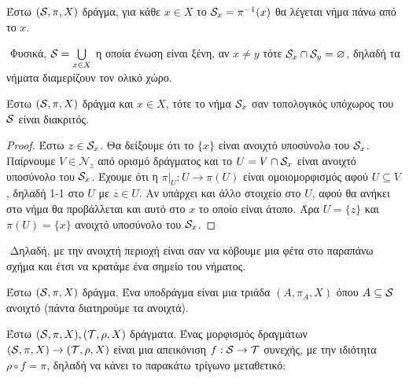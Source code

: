 \begin{defn} Έστω $(\mathcal{S}, \pi, X)$ δράγμα, για κάθε $x \in X$ το $\mathcal{S}_x = \pi^{-1}(x)$ θα λέγεται νήμα πάνω από το $x$.
\end{defn}

$ $\newline
Φυσικά, $\mathcal{S} = \bigcup\limits_{x \in X}$ η οποία ένωση είναι ξένη, αν $x\neq y$ τότε $\mathcal{S}_x \cap \mathcal{S}_y = \varnothing$, δηλαδή τα νήματα διαμερίζουν τον ολικό χώρο.

\begin{lemma} Έστω $(\mathcal{S}, \pi, X)$ δράγμα και $x \in X$, τότε το νήμα $\mathcal{S}_x$ σαν τοπολογικός υπόχωρος του $\mathcal{S}$ είναι διακριτός.

\end{lemma}


\begin{figure}[H]
    \centering
\end{figure}

\begin{proof}
    Έστω $z \in \mathcal{S}_x$. Θα δείξουμε ότι το $\{x\}$ είναι ανοιχτό υποσύνολο του $\mathcal{S}_x$. Παίρνουμε $V \in \mathcal{N}_z$ από ορισμό δράγματος και το $U = V\cap \mathcal{S}_x$ είναι ανοιχτό υποσύνολο του $\mathcal{S}_x$. Έχουμε ότι η $\pi|_U : U \rightarrow \pi(U)$ είναι ομοιομορφισμός αφού $U\subseteq V$, δηλαδή 1-1 στο $U$ με $z \in U$. Αν υπάρχει και άλλο στοιχείο στο $U$, αφού θα ανήκει στο νήμα θα προβάλλεται και αυτό στο $x$ το οποίο είναι άτοπο. Άρα $U = \{z\}$ και $\pi(U) = \{x\}$ ανοιχτό υποσύνολο του $\mathcal{S}_x$.
\end{proof}

$ $\newline
Δηλαδή, με την ανοιχτή περιοχή είναι σαν να κόβουμε μια φέτα στο παραπάνω σχήμα και έτσι να κρατάμε ένα σημείο του νήματος.

\begin{defn} Έστω $(\mathcal{S}, \pi, X)$ δράγμα. Ένα υποδράγμα είναι μια τριάδα $(A,\pi_A, X)$ όπου $A \subseteq \mathcal{S}$ ανοιχτό (πάντα διατηρούμε τα ανοιχτά).
\end{defn}

\begin{defn} Έστω $(\mathcal{S}, \pi, X), (\mathcal{T}, \rho, X)$ δράγματα. Ένας μορφισμός δραγμάτων $(\mathcal{S}, \pi, X) \rightarrow (\mathcal{T}, \rho, X)$ είναι μια απεικόνιση $f : \mathcal{S} \rightarrow \mathcal{T}$ συνεχής, με την ιδιότητα $\rho \circ f = \pi$, δηλαδή να κάνει το παρακάτω τρίγωνο μεταθετικό: 
\end{defn}

\begin{figure}[H]
    \centering
{}
\end{figure}

